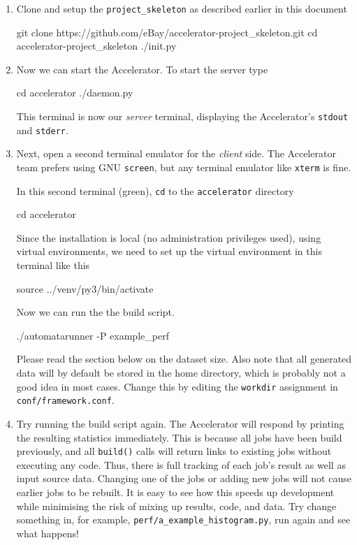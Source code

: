\documentclass[a4paper]{article}
\begin{document}
\begin{enumerate}
\item Clone and setup the \texttt{project\_skeleton} as described
  earlier in this document
\begin{shell}
git clone https://github.com/eBay/accelerator-project_skeleton.git
cd accelerator-project_skeleton
./init.py
\end{shell}

\item Now we can start the Accelerator.  To start the server type
  \begin{shell}
cd accelerator
./daemon.py
  \end{shell}
  This terminal is now our \textsl{server} terminal, displaying the
  Accelerator's \texttt{stdout} and \texttt{stderr}.
  
\item Next, open a second terminal emulator for the \textsl{client}
  side.  The Accelerator team prefers using GNU \texttt{screen}, but any
  terminal emulator like \texttt{xterm} is fine.

  In this second terminal (green), \texttt{cd} to the
  \texttt{accelerator} directory
\begin{shell2}
cd accelerator
\end{shell2}
Since the installation is local (no administration privileges used),
using virtual environments, we need to set up the virtual environment
in this terminal like this
\begin{shell2}
source ../venv/py3/bin/activate
\end{shell2}
Now we can run the the build script.
\begin{shell2}
./automatarunner -P example_perf
\end{shell2}
Please read the section below on the dataset size.  Also note that all
generated data will by default be stored in the home directory, which
is probably not a good idea in most cases.  Change this by editing
the \texttt{workdir} assignment in \texttt{conf/framework.conf}.

\item Try running the build script again.  The Accelerator will
  respond by printing the resulting statistics immediately.  This is
  because all jobs have been build previously, and all
  \texttt{build()} calls will return links to existing jobs without
  executing any code.  Thus, there is full tracking of each job's
  result as well as input source data.  Changing one of the jobs or
  adding new jobs will not cause earlier jobs to be rebuilt.  It is
  easy to see how this speeds up development while minimising the risk
  of mixing up results, code, and data.  Try change something in, for
  example, \texttt{perf/a\_example\_histogram.py}, run again and see
  what happens!
\end{enumerate}
\end{document}
